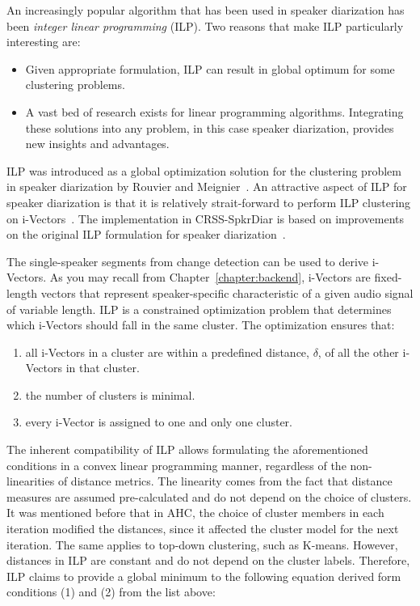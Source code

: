 An increasingly popular algorithm that has been used in speaker diarization has been {\it integer linear programming} (ILP). 
Two reasons that make ILP particularly interesting are: 
\begin{itemize}
	\item Given appropriate formulation, ILP can result in global optimum for some clustering problems. 
	\item A vast bed of research exists for linear programming algorithms. Integrating these solutions into any problem, in this case speaker diarization, provides new insights and advantages. 
\end{itemize}

ILP was introduced as a global optimization solution for the clustering problem in speaker diarization by Rouvier and Meignier~\cite{rouvier2012ilp}. 
An attractive aspect of ILP for speaker diarization is that it is relatively strait-forward to perform ILP clustering on i-Vectors~\cite{dupuy2012ivectorsILP}. 
The implementation in CRSS-SpkrDiar is based on improvements on the original ILP formulation for speaker diarization~\cite{dupuy2014ILPimprovement}. 

The single-speaker segments from change detection can be used to derive i-Vectors. 
As you may recall from Chapter~\ref{chapter:backend}, i-Vectors are fixed-length vectors that represent speaker-specific characteristic of a given audio signal of variable length. 
ILP is a constrained optimization problem that determines which i-Vectors should fall in the same cluster. 
The optimization ensures that:
\begin{enumerate}
	\item all i-Vectors in a cluster are within a predefined distance, $\delta$, of all the other i-Vectors in that cluster. 
	\item the number of clusters is minimal. 
	\item every i-Vector is assigned to one and only one cluster. 
\end{enumerate}

The inherent compatibility of ILP allows formulating the aforementioned conditions in a convex linear programming manner, regardless of the non-linearities of distance metrics. 
The linearity comes from the fact that distance measures are assumed pre-calculated and do not depend on the choice of clusters. 
It was mentioned before that in AHC, the choice of cluster members in each iteration modified the distances, since it affected the cluster model for the next iteration. 
The same applies to top-down clustering, such as K-means. 
However, distances in ILP are constant and do not depend on the cluster labels. 
Therefore, ILP claims to provide a global minimum to the following equation derived form conditions (1) and (2) from the list above: 


